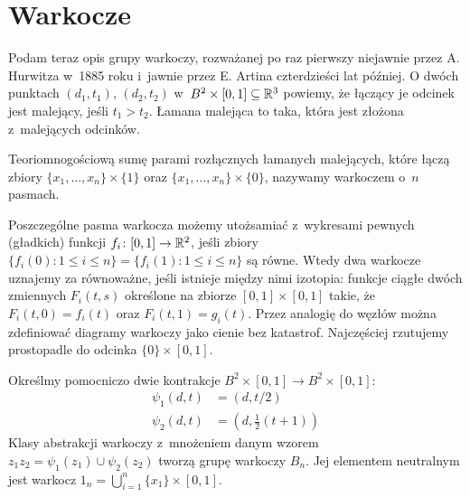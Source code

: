 \section{Warkocze} %
\label{sec:braid}
Podam teraz opis grupy warkoczy, rozważanej po raz pierwszy niejawnie przez A. Hurwitza w~1885 roku i~jawnie przez E. Artina czterdzieści lat później.
O dwóch punktach $(d_1, t_1)$, $(d_2, t_2)$ w~$B^2 \times [0, 1] \subseteq \mathbb R^3$ powiemy, że łączący je odcinek jest malejący, jeśli $t_1 > t_2$.
Łamana malejąca to taka, która jest złożona z~malejących odcinków.

\begin{definition}[warkocz]
    \label{braid_def}
    Teoriomnogościową sumę parami rozłącznych łamanych malejących, które łączą zbiory $\{x_1, \ldots, x_n\} \times \{1\}$ oraz $\{x_1, \ldots, x_n\} \times \{0\}$, nazywamy warkoczem o~$n$ pasmach.
\end{definition}

Poszczególne pasma warkocza możemy utożsamiać z~wykresami pewnych (gładkich) funkcji $f_i \colon [0, 1] \to \mathbb R^2$, jeśli zbiory $\{f_i(0) : 1 \le i \le n\} = \{f_i(1) : 1 \le i \le n\}$ są równe.
Wtedy dwa warkocze uznajemy za równoważne, jeśli istnieje między nimi izotopia: funkcje ciągłe dwóch zmiennych $F_i(t, s)$ określone na zbiorze $[0,1] \times [0,1]$ takie, że $F_i(t,0)= f_i(t)$ oraz $F_i(t, 1) = g_i(t)$.
Przez analogię do węzłów można zdefiniować diagramy warkoczy jako cienie bez katastrof.
Najczęściej rzutujemy prostopadle do odcinka $\{0\} \times [0, 1]$.

\begin{definition}
    Określmy pomocniczo dwie kontrakcje $B^2 \times [0,1] \to B^2 \times [0,1]$:
    \begin{align*}
        \psi_1(d, t)&  = (d, t/2) \\
        \psi_2(d, t)&  = (d, \frac12 (t+1))
    \end{align*}
    Klasy abstrakcji warkoczy z~mnożeniem danym wzorem $z_1z_2 = \psi_1(z_1) \cup \psi_2(z_2)$ tworzą grupę warkoczy $B_n$.
    Jej elementem neutralnym jest warkocz $1_n = \bigcup_{i = 1}^n \{x_1\} \times [0,1]$.
\end{definition}

